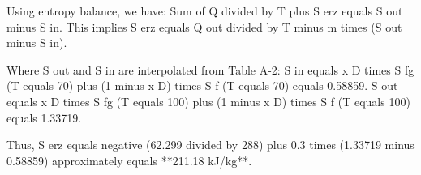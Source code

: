 Using entropy balance, we have:  
Sum of Q divided by T plus S erz equals S out minus S in.  
This implies S erz equals Q out divided by T minus m times (S out minus S in).  

Where S out and S in are interpolated from Table A-2:  
S in equals x D times S fg (T equals 70) plus (1 minus x D) times S f (T equals 70) equals 0.58859.  
S out equals x D times S fg (T equals 100) plus (1 minus x D) times S f (T equals 100) equals 1.33719.  

Thus, S erz equals negative (62.299 divided by 288) plus 0.3 times (1.33719 minus 0.58859) approximately equals **211.18 kJ/kg**.